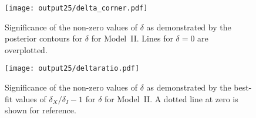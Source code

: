 \documentclass{aastex61}   	%
\begin{document}
\begin{figure}[htbp] %
   \centering
   \texttt{[image: output25/delta\_corner.pdf]}
   \caption{Significance of the non-zero values of $\delta$ as demonstrated by the posterior contours for $\delta$ for Model~II.
   Lines for $\delta=0$ are overplotted.
   \label{deltacorner:fig}}
\end{figure}


\begin{figure}[htbp] %
   \centering
      \texttt{[image: output25/deltaratio.pdf]}
   \caption{Significance of the non-zero values of $\delta$ as demonstrated by the best-fit values of $\delta_X/\delta_I-1$ for $\delta$ for Model~II.
   A dotted line at zero is shown for reference.
   \label{deltaratio:fig}}
\end{figure}
\end{document}
